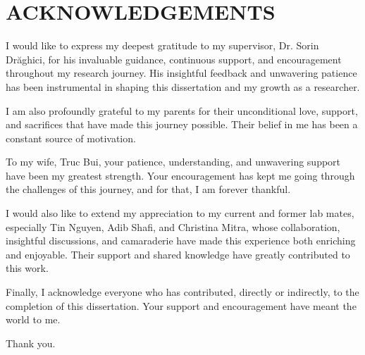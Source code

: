 \section*{ACKNOWLEDGEMENTS}

\begin{center}
	I would like to express my deepest gratitude to my supervisor, Dr. Sorin Dr\u{a}ghici, for his invaluable guidance, continuous support, and encouragement throughout my research journey. His insightful feedback and unwavering patience has been instrumental in shaping this dissertation and my growth as a researcher.

I am also profoundly grateful to my parents for their unconditional love, support, and sacrifices that have made this journey possible. Their belief in me has been a constant source of motivation.

To my wife, Truc Bui, your patience, understanding, and unwavering support have been my greatest strength. Your encouragement has kept me going through the challenges of this journey, and for that, I am forever thankful.

I would also like to extend my appreciation to my current and former lab mates, especially Tin Nguyen, Adib Shafi, and Christina Mitra, whose collaboration, insightful discussions, and camaraderie have made this experience both enriching and enjoyable. Their support and shared knowledge have greatly contributed to this work.

Finally, I acknowledge everyone who has contributed, directly or indirectly, to the completion of this dissertation. Your support and encouragement have meant the world to me.

Thank you.

\end{center}
